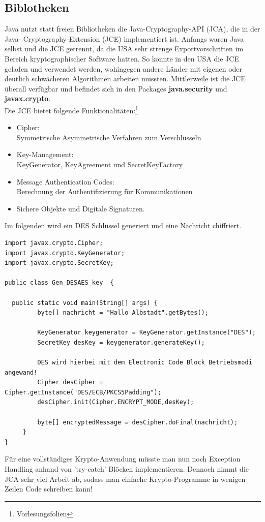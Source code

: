 \documentclass[a4paper,12pt]{scrartcl}
\begin{document}
\subsection{Biblotheken}
Java nutzt statt freien Bibliotheken die Java-Cryptography-API (JCA), die in der Java-
Cryptography-Extension (JCE) implementiert ist.
Anfangs waren Java selbst und die JCE getrennt, da die USA sehr strenge Exportvorschriften
im Bereich kryptographischer Software hatten. So konnte in den USA die JCE geladen und
verwendet werden, wohingegen andere Länder mit eigenen oder deutlich schwächeren Algorithmen arbeiten mussten.
Mittlerweile ist die JCE überall verfügbar und befindet sich in den Packages \textbf{java.security} und \textbf{javax.crypto}.\\
Die JCE bietet folgende Funktionalitäten:\footnote{Vorlesungsfolien}\\
\begin{itemize}
 \item Cipher:\\
 Symmetrische Asymmetrische Verfahren zum Verschlüsseln
 \item Key-Management:\\ KeyGenerator, KeyAgreement und SecretKeyFactory
 \item Message Authentication Codes:\\
 Berechnung der Authentifizierung für Kommunikationen
 \item Sichere Objekte und Digitale Signaturen.
\end{itemize}
Im folgenden wird ein DES Schlüssel generiert und eine Nachricht chiffriert.
\begin{verbatim}
import javax.crypto.Cipher;
import javax.crypto.KeyGenerator;
import javax.crypto.SecretKey;

public class Gen_DESAES_key  {

  public static void main(String[] args) {
         byte[] nachricht = "Hallo Albstadt".getBytes();

         KeyGenerator keygenerator = KeyGenerator.getInstance("DES");
         SecretKey desKey = keygenerator.generateKey();
		 
         DES wird hierbei mit dem Electronic Code Block Betriebsmodi angewand!
         Cipher desCipher = Cipher.getInstance("DES/ECB/PKCS5Padding");
         desCipher.init(Cipher.ENCRYPT_MODE,desKey);

         byte[] encryptedMessage = desCipher.doFinal(nachricht);
     }   
}
\end{verbatim}
Für eine vollständiges Krypto-Anwendung müsste man nun noch Exception Handling anhand von 'try-catch' Blöcken implementieren. Dennoch nimmt die JCA sehr viel Arbeit ab, sodass man einfache Krypto-Programme in wenigen Zeilen Code schreiben kann!\\
\end{document}
